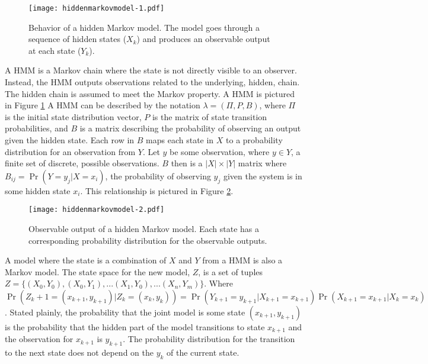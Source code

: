 \begin{figure}
	\centering
	\texttt{[image: hiddenmarkovmodel-1.pdf]}
	\caption[Behavior of a hidden Markov model.]{Behavior of a hidden Markov model. The model goes through a sequence of hidden states ($X_k$) and produces an observable output at each state ($Y_k$).}
	\label{fig:hmm-1}
\end{figure}

A \ac{HMM} is a Markov chain where the state is not directly visible to an observer.
Instead, the \ac{HMM} outputs observations related to the underlying, hidden, chain.
The hidden chain is assumed to meet the Markov property.
A \ac{HMM} is pictured in Figure \ref{fig:hmm-1}
A \ac{HMM} can be described by the notation $\lambda = (\Pi, P, B)$, where $\Pi$ is the initial state distribution vector, $P$ is the matrix of state transition probabilities, and $B$ is a matrix describing the probability of observing an output given the hidden state.
Each row in $B$ maps each state in $X$ to a probability distribution for an observation from $Y$.
Let $y$ be some observation, where $y \in Y$, a finite set of discrete, possible observations.
$B$ then is a $|X|\times|Y|$ matrix where $B_{ij} = \Pr(Y=y_j|X=x_i)$, the probability of observing $y_j$ given the system is in some hidden state $x_i$.
This relationship is pictured in Figure \ref{fig:hmm-2}.

\begin{figure}
	\centering
	\texttt{[image: hiddenmarkovmodel-2.pdf]}
	\caption[Observable output of a hidden Markov model.]{Observable output of a hidden Markov model. Each state has a corresponding probability distribution for the observable outputs.}
	\label{fig:hmm-2}
\end{figure}

A model where the state is a combination of $X$ and $Y$ from a \ac{HMM} is also a Markov model.
The state space for the new model, $Z$, is a set of tuples $Z = \{(X_0,Y_0), (X_0, Y_1), ... (X_1, Y_0), ... (X_n,Y_m)  \}$.
Where $\Pr(Z_k+1=(x_{k+1}, y_{k+1})|Z_k=(x_k, y_k)) = \Pr(Y_{k+1}=y_{k+1}|X_{k+1}=x_{k+1})\Pr(X_{k+1}=x_{k+1}|X_{k}=x_k)$.
Stated plainly, the probability that the joint model is some state $(x_{k+1},y_{k+1})$ is the probability that the hidden part of the model transitions to state $x_{k+1}$ and the observation for $x_{k+1}$ is $y_{k+1}$.
The probability distribution for the transition to the next state does not depend on the $y_k$ of the current state.

